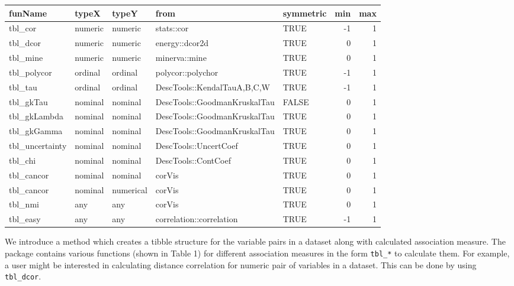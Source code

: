 \begin{Schunk}

\begin{tabular}[t]{lllllrr}
\toprule
funName & typeX & typeY & from & symmetric & min & max\\
\midrule
tbl\_cor & numeric & numeric & stats::cor & TRUE & -1 & 1\\
tbl\_dcor & numeric & numeric & energy::dcor2d & TRUE & 0 & 1\\
tbl\_mine & numeric & numeric & minerva::mine & TRUE & 0 & 1\\
tbl\_polycor & ordinal & ordinal & polycor::polychor & TRUE & -1 & 1\\
tbl\_tau & ordinal & ordinal & DescTools::KendalTauA,B,C,W & TRUE & -1 & 1\\
\addlinespace
tbl\_gkTau & nominal & nominal & DescTools::GoodmanKruskalTau & FALSE & 0 & 1\\
tbl\_gkLambda & nominal & nominal & DescTools::GoodmanKruskalTau & TRUE & 0 & 1\\
tbl\_gkGamma & nominal & nominal & DescTools::GoodmanKruskalTau & TRUE & 0 & 1\\
tbl\_uncertainty & nominal & nominal & DescTools::UncertCoef & TRUE & 0 & 1\\
tbl\_chi & nominal & nominal & DescTools::ContCoef & TRUE & 0 & 1\\
\addlinespace
tbl\_cancor & nominal & nominal & corVis & TRUE & 0 & 1\\
tbl\_cancor & nominal & numerical & corVis & TRUE & 0 & 1\\
tbl\_nmi & any & any & corVis & TRUE & 0 & 1\\
tbl\_easy & any & any & correlation::correlation & TRUE & -1 & 1\\
\bottomrule
\end{tabular}

\end{Schunk}

We introduce a method which creates a tibble structure for the variable
pairs in a dataset along with calculated association measure. The
package contains various functions (shown in Table 1) for different
association measures in the form \texttt{tbl\_*} to calculate them. For
example, a user might be interested in calculating distance correlation
for numeric pair of variables in a dataset. This can be done by using
\texttt{tbl\_dcor}.

